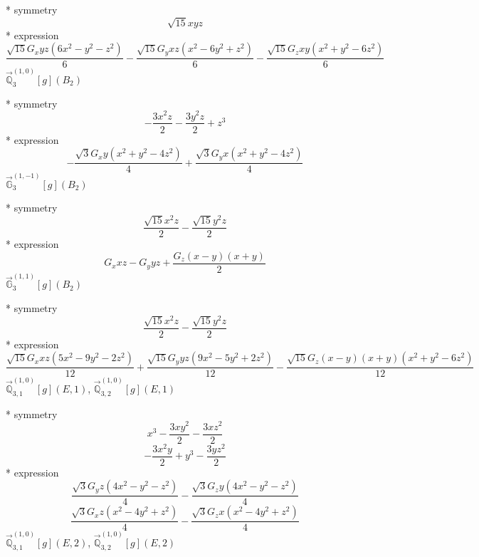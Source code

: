 \documentclass[fleqn,8pt]{jsarticle}
\begin{document}
\noindent\quad ** symmetry
\begin{dmath*}
\sqrt{15} x y z
\end{dmath*}
\noindent\quad ** expression
\begin{dmath*}
\frac{\sqrt{15} G_{x} y z \left(6 x^{2} - y^{2} - z^{2}\right)}{6} - \frac{\sqrt{15} G_{y} x z \left(x^{2} - 6 y^{2} + z^{2}\right)}{6} - \frac{\sqrt{15} G_{z} x y \left(x^{2} + y^{2} - 6 z^{2}\right)}{6}
\end{dmath*}
\noindent\quad $\vec{\mathbb{Q}}_{3}^{(1,0)}[g](B_{2})$

\noindent\quad ** symmetry
\begin{dmath*}
- \frac{3 x^{2} z}{2} - \frac{3 y^{2} z}{2} + z^{3}
\end{dmath*}
\noindent\quad ** expression
\begin{dmath*}
- \frac{\sqrt{3} G_{x} y \left(x^{2} + y^{2} - 4 z^{2}\right)}{4} + \frac{\sqrt{3} G_{y} x \left(x^{2} + y^{2} - 4 z^{2}\right)}{4}
\end{dmath*}
\noindent\quad $\vec{\mathbb{G}}_{3}^{(1,-1)}[g](B_{2})$

\noindent\quad ** symmetry
\begin{dmath*}
\frac{\sqrt{15} x^{2} z}{2} - \frac{\sqrt{15} y^{2} z}{2}
\end{dmath*}
\noindent\quad ** expression
\begin{dmath*}
G_{x} x z - G_{y} y z + \frac{G_{z} \left(x - y\right) \left(x + y\right)}{2}
\end{dmath*}
\noindent\quad $\vec{\mathbb{G}}_{3}^{(1,1)}[g](B_{2})$

\noindent\quad ** symmetry
\begin{dmath*}
\frac{\sqrt{15} x^{2} z}{2} - \frac{\sqrt{15} y^{2} z}{2}
\end{dmath*}
\noindent\quad ** expression
\begin{dmath*}
\frac{\sqrt{15} G_{x} x z \left(5 x^{2} - 9 y^{2} - 2 z^{2}\right)}{12} + \frac{\sqrt{15} G_{y} y z \left(9 x^{2} - 5 y^{2} + 2 z^{2}\right)}{12} - \frac{\sqrt{15} G_{z} \left(x - y\right) \left(x + y\right) \left(x^{2} + y^{2} - 6 z^{2}\right)}{12}
\end{dmath*}
\noindent\quad $\vec{\mathbb{Q}}_{3,1}^{(1,0)}[g](E,1)$, $\vec{\mathbb{Q}}_{3,2}^{(1,0)}[g](E,1)$

\noindent\quad ** symmetry
\begin{dmath*}
x^{3} - \frac{3 x y^{2}}{2} - \frac{3 x z^{2}}{2}
\end{dmath*}
\begin{dmath*}
- \frac{3 x^{2} y}{2} + y^{3} - \frac{3 y z^{2}}{2}
\end{dmath*}
\noindent\quad ** expression
\begin{dmath*}
\frac{\sqrt{3} G_{y} z \left(4 x^{2} - y^{2} - z^{2}\right)}{4} - \frac{\sqrt{3} G_{z} y \left(4 x^{2} - y^{2} - z^{2}\right)}{4}
\end{dmath*}
\begin{dmath*}
\frac{\sqrt{3} G_{x} z \left(x^{2} - 4 y^{2} + z^{2}\right)}{4} - \frac{\sqrt{3} G_{z} x \left(x^{2} - 4 y^{2} + z^{2}\right)}{4}
\end{dmath*}
\noindent\quad $\vec{\mathbb{Q}}_{3,1}^{(1,0)}[g](E,2)$, $\vec{\mathbb{Q}}_{3,2}^{(1,0)}[g](E,2)$
\end{document}
